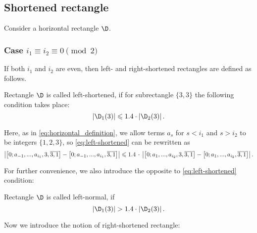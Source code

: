 \subsection{Shortened rectangle}
\label{sbsc:shortened}

Consider a horizontal rectangle $\D$.


\subsubsection{Case $i_1 \equiv i_2 \equiv 0 \pmod 2$}
\label{sbsbsc:shortened_even}

If both $i_1$ and $i_2$ are even, then left- and right-shortened rectangles are defined as follows.

\begin{definition}
	Rectangle $\D$ is called left-shortened,
	if for subrectangle $\{3, 3\}$ the following condition takes place:
	\begin{equation}
		\label{eq:left-shortened}
		\left| \D_1(3) \right| \leqslant 1.4 \cdot \left| \D_2(3) \right|.
	\end{equation}
\end{definition}

Here, as in \ref{eq:horizontal_definition},
we allow terms $a_s$ for $s < i_1$ and $s > i_2$ to be integers $\{1, 2, 3\}$,
so \ref{eq:left-shortened} can be rewritten as
%
\begin{equation*}
	\hspace*{-1pt}
	\left|
		\left[ 0; a_{-1}, ..., a_{i_1}, 3, \overline{3, 1} \right] -
		\left[ 0; a_{-1}, ..., a_{i_1}, \overline{3, 1} \right]
	\right| \leqslant 1.4 \,\cdot\, \left|
		\left[ 0; a_{1}, ..., a_{i_2}, 3, \overline{3, 1} \right] -
		\left[ 0; a_{1}, ..., a_{i_2}, \overline{3, 1} \right]
	\right|.
	\hspace*{-1pt}
\end{equation*}

For further convenience, we also introduce the opposite to \ref{eq:left-shortened} condition:

\begin{definition}
	Rectangle $\D$ is called left-normal, if
	\begin{equation}
		\label{eq:left-normal}
		\left| \D_1(3) \right| > 1.4 \cdot \left| \D_2(3) \right|.
	\end{equation}
\end{definition}

Now we introduce the notion of right-shortened rectangle:

